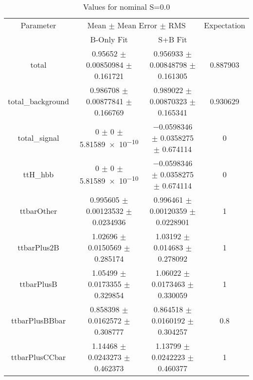 \begin{table}
\centering
\caption{Values for nominal S=0.0}
\begin{tabular}{cccc}
\toprule
Parameter & \multicolumn{2}{c}{Mean $\pm$ Mean Error $\pm$ RMS} & Expectation\\
 & B-Only Fit & S+B Fit & \\
\midrule
total & \num{0.95652} $\pm$ \num{0.00850984} $\pm$ \num{0.161721} & \num{0.956933} $\pm$ \num{0.00848798} $\pm$ \num{0.161305} & \num{0.887903}\\
total\_background & \num{0.986708} $\pm$ \num{0.00877841} $\pm$ \num{0.166769} & \num{0.989022} $\pm$ \num{0.00870323} $\pm$ \num{0.165341} & \num{0.930629}\\
total\_signal & \num{0} $\pm$ \num{0} $\pm$ \num{5.81589e-10} & \num{-0.0598346} $\pm$ \num{0.0358275} $\pm$ \num{0.674114} & \num{0}\\
ttH\_hbb & \num{0} $\pm$ \num{0} $\pm$ \num{5.81589e-10} & \num{-0.0598346} $\pm$ \num{0.0358275} $\pm$ \num{0.674114} & \num{0}\\
ttbarOther & \num{0.995605} $\pm$ \num{0.00123532} $\pm$ \num{0.0234936} & \num{0.996461} $\pm$ \num{0.00120359} $\pm$ \num{0.0228901} & \num{1}\\
ttbarPlus2B & \num{1.02696} $\pm$ \num{0.0150569} $\pm$ \num{0.285174} & \num{1.03192} $\pm$ \num{0.014683} $\pm$ \num{0.278092} & \num{1}\\
ttbarPlusB & \num{1.05499} $\pm$ \num{0.0173355} $\pm$ \num{0.329854} & \num{1.06022} $\pm$ \num{0.0173463} $\pm$ \num{0.330059} & \num{1}\\
ttbarPlusBBbar & \num{0.858398} $\pm$ \num{0.0162572} $\pm$ \num{0.308777} & \num{0.864518} $\pm$ \num{0.0160192} $\pm$ \num{0.304257} & \num{0.8}\\
ttbarPlusCCbar & \num{1.14468} $\pm$ \num{0.0243273} $\pm$ \num{0.462373} & \num{1.13799} $\pm$ \num{0.0242223} $\pm$ \num{0.460377} & \num{1}\\
\bottomrule
\end{tabular}
\end{table}
